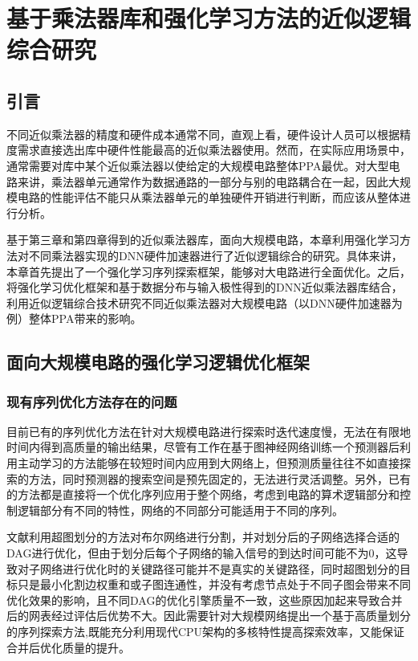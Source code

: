 \chapter{基于乘法器库和强化学习方法的近似逻辑综合研究}

\section{引言}

不同近似乘法器的精度和硬件成本通常不同，直观上看，硬件设计人员可以根据精度需求直接选出库中硬件性能最高的近似乘法器使用。然而，在实际应用场景中，通常需要对库中某个近似乘法器以使给定的大规模电路整体PPA最优。对大型电路来讲，乘法器单元通常作为数据通路的一部分与别的电路耦合在一起，因此大规模电路的性能评估不能只从乘法器单元的单独硬件开销进行判断，而应该从整体进行分析。

基于第三章和第四章得到的近似乘法器库，面向大规模电路，本章利用强化学习方法对不同乘法器实现的DNN硬件加速器进行了近似逻辑综合的研究。具体来讲，本章首先提出了一个强化学习序列探索框架，能够对大电路进行全面优化。之后，将强化学习优化框架和基于数据分布与输入极性得到的DNN近似乘法器库结合，利用近似逻辑综合技术研究不同近似乘法器对大规模电路（以DNN硬件加速器为例）整体PPA带来的影响。

\section{面向大规模电路的强化学习逻辑优化框架}

\subsection{现有序列优化方法存在的问题}

目前已有的序列优化方法\cite{LS:BOiLS,LS:DRiLLS}在针对大规模电路进行探索时迭代速度慢，无法在有限地时间内得到高质量的输出结果，尽管有工作\cite{LS:Bulls-Eye}在基于图神经网络训练一个预测器后利用主动学习的方法能够在较短时间内应用到大网络上，但预测质量往往不如直接探索的方法，同时预测器的搜索空间是预先固定的，无法进行灵活调整。另外，已有的方法都是直接将一个优化序列应用于整个网络，考虑到电路的算术逻辑部分和控制逻辑部分有不同的特性\cite{LS:MIG}，网络的不同部分可能适用于不同的序列。

文献\cite{LS:LSOracle}利用超图划分的方法对布尔网络进行分割，并对划分后的子网络选择合适的DAG进行优化，但由于划分后每个子网络的输入信号的到达时间可能不为0，这导致对子网络进行优化时的关键路径可能并不是真实的关键路径，同时超图划分的目标只是最小化割边权重和或子图连通性，并没有考虑节点处于不同子图会带来不同优化效果的影响，且不同DAG的优化引擎质量不一致，这些原因加起来导致合并后的网表经过评估后优势不大。因此需要针对大规模网络提出一个基于高质量划分的序列探索方法,既能充分利用现代CPU架构的多核特性提高探索效率，又能保证合并后优化质量的提升。


